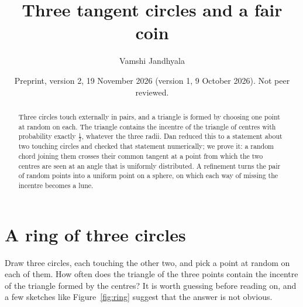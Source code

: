 \documentclass[11pt]{article}
\title{Three tangent circles and a fair coin}
\author{Vamshi Jandhyala}
\date{Preprint, version 2, 19 November 2026 (version 1, 9 October 2026). Not peer reviewed.}
\theoremstyle{remark}
\begin{document}
\maketitle
\vspace{-2em}

\begin{abstract}
Three circles touch externally in pairs, and a triangle is formed by choosing one point at random
on each. The triangle contains the incentre of the triangle of centres with probability exactly
$\frac12$, whatever the three radii. Dan reduced this to a statement about two touching circles and
checked that statement numerically; we prove it:
a random chord joining them crosses their common tangent at a point from which the two
centres are seen at an angle that is uniformly distributed. A refinement turns the pair of
random points into a uniform point on a sphere, on which each way of missing the incentre
becomes a lune.
\end{abstract}

\section{A ring of three circles}

Draw three circles, each touching the other two, and pick a point at random on each of them.
How often does the triangle of the three points contain the incentre of the triangle formed
by the centres? It is worth guessing before reading on, and a few sketches like
Figure~\ref{fig:ring} suggest that the answer is not obvious.
\end{document}

